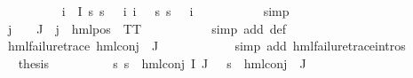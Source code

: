 \begin{isabellebody}
\ \ \ \ \ \ \ \ \isamarkupfalse%
\ {\isacartoucheopen}{\isasymforall}i\ {\isasymin}\ I{\isachardot}{\kern0pt}\ {\isacharparenleft}{\kern0pt}{\isasymforall}s{\isachardot}{\kern0pt}\ {\isacharparenleft}{\kern0pt}s\ {\isasymTurnstile}\ {\isacharparenleft}{\kern0pt}{\isasymPhi}\ i{\isacharparenright}{\kern0pt}{\isacharparenright}{\kern0pt}{\isacharparenright}{\kern0pt}{\isacartoucheclose}\ {\isacartoucheopen}{\isasymforall}i\ {\isasymin}\ {\isacharbraceleft}{\kern0pt}{\isacharbraceright}{\kern0pt}{\isachardot}{\kern0pt}\ {\isacharparenleft}{\kern0pt}{\isasymforall}s{\isachardot}{\kern0pt}\ {\isacharparenleft}{\kern0pt}s\ {\isasymTurnstile}\ {\isacharparenleft}{\kern0pt}{\isasymPhi}\ i{\isacharparenright}{\kern0pt}{\isacharparenright}{\kern0pt}{\isacharparenright}{\kern0pt}{\isacartoucheclose}\ \isanewline
\ \ \ \ \ \ \ \ \isamarkupfalse%
\ simp\isanewline
\ \ \ \ \ \ \isamarkupfalse%
\ {\isachardoublequoteopen}{\isasymforall}j\ {\isasymin}\ {\isasymPsi}\ {\isacharbackquote}{\kern0pt}\ J{\isachardot}{\kern0pt}\ {\isasymexists}{\isasymalpha}{\isachardot}{\kern0pt}\ j\ {\isacharequal}{\kern0pt}\ {\isacharparenleft}{\kern0pt}hml{\isacharunderscore}{\kern0pt}pos\ {\isasymalpha}\ TT{\isacharparenright}{\kern0pt}{\isachardoublequoteclose}\ \isanewline
\ \ \ \ \ \ \ \ \isamarkupfalse%
\ {\isacharparenleft}{\kern0pt}simp\ add{\isacharcolon}{\kern0pt}\ {\isasymPsi}{\isacharunderscore}{\kern0pt}def{\isacharparenright}{\kern0pt}\isanewline
\ \ \ \ \ \ \isamarkupfalse%
\ {\isachardoublequoteopen}hml{\isacharunderscore}{\kern0pt}failure{\isacharunderscore}{\kern0pt}trace\ {\isacharparenleft}{\kern0pt}hml{\isacharunderscore}{\kern0pt}conj\ {\isacharbraceleft}{\kern0pt}{\isacharbraceright}{\kern0pt}\ J\ {\isasymPsi}{\isacharparenright}{\kern0pt}{\isachardoublequoteclose}\ \isanewline
\ \ \ \ \ \ \ \ \isamarkupfalse%
\ {\isacharparenleft}{\kern0pt}simp\ add{\isacharcolon}{\kern0pt}\ hml{\isacharunderscore}{\kern0pt}failure{\isacharunderscore}{\kern0pt}trace{\isachardot}{\kern0pt}intros{\isacharparenleft}{\kern0pt}{}{\isacharparenright}{\kern0pt}{\isacharparenright}{\kern0pt}\isanewline
\ \ \ \ \ \ \isamarkupfalse%
\ \isamarkupfalse%
\ {\isacharquery}{\kern0pt}thesis\isanewline
\ \ \ \ \ \ \ \ \isamarkupfalse%
\ {\isacartoucheopen}{\isasymforall}s{\isachardot}{\kern0pt}\ {\isacharparenleft}{\kern0pt}s\ {\isasymTurnstile}\ hml{\isacharunderscore}{\kern0pt}conj\ I\ J\ {\isasymPhi}{\isacharparenright}{\kern0pt}\ {\isacharequal}{\kern0pt}\ {\isacharparenleft}{\kern0pt}s\ {\isasymTurnstile}\ hml{\isacharunderscore}{\kern0pt}conj\ {\isacharbraceleft}{\kern0pt}{\isacharbraceright}{\kern0pt}\ J\ {\isasymPsi}{\isacharparenright}{\kern0pt}{\isacartoucheclose}\ \isamarkupfalse%

\end{isabellebody}
